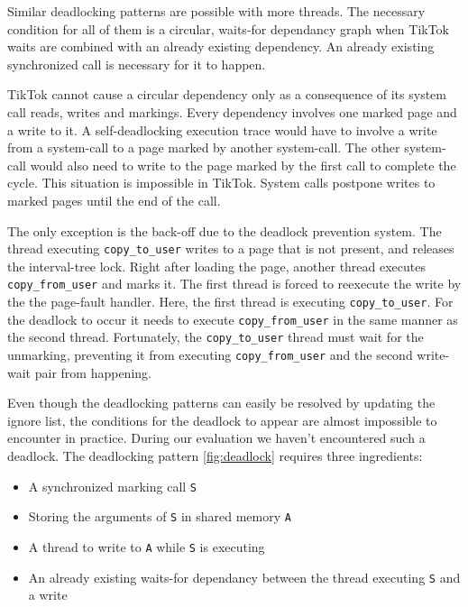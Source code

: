 \documentclass[conference]{IEEEtran}
\newcommand{\sysname}{TikTok}
\begin{document}
Similar deadlocking patterns are possible with more threads. The necessary
condition for all of them is a circular, waits-for dependancy graph when \sysname
waits are combined with an already existing dependency. An already
existing synchronized call is necessary for it to happen.

\sysname{} cannot cause a circular dependency only as a consequence of its
system call reads, writes and markings. Every dependency involves one marked
page and a write to it. A self-deadlocking execution trace would have to involve
a write from a system-call to a page marked by another system-call. The other
system-call would also need to write to the page marked by the first call to
complete the cycle. This situation is impossible in \sysname. System calls
postpone writes to marked pages until the end of the call.

The only exception is the back-off due to the deadlock prevention system. The
thread executing \texttt{copy\_to\_user} writes to a page that is not present,
and releases the interval-tree lock. Right after loading the page, another
thread executes \texttt{copy\_from\_user} and marks it. The first thread is
forced to reexecute the write by the the page-fault handler. Here, the first
thread is executing \texttt{copy\_to\_user}. For the deadlock to occur it needs
to execute \texttt{copy\_from\_user} in the same manner as the second thread.
Fortunately, the \texttt{copy\_to\_user} thread must wait for the unmarking,
preventing it from executing \texttt{copy\_from\_user} and the second write-wait
pair from happening.

Even though the deadlocking patterns can easily be resolved by updating the
ignore list, the conditions for the deadlock to appear are almost impossible to
encounter in practice. During our evaluation we haven't encountered such a
deadlock. The deadlocking pattern \autoref{fig:deadlock} requires three
ingredients:

\begin{itemize}
  \item A synchronized marking call \texttt{S}
  \item Storing the arguments of \texttt{S} in shared memory \texttt{A}
  \item A thread to write to \texttt{A} while \texttt{S} is executing
  \item An already existing waits-for dependancy between the thread executing \texttt{S} and a write
\end{itemize}
\end{document}

